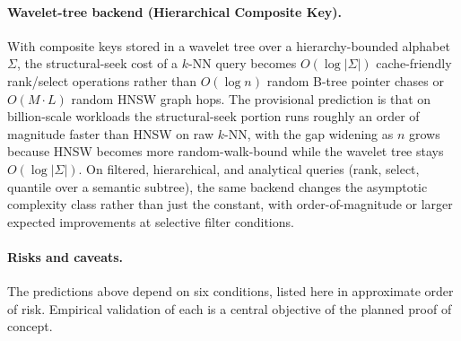 \documentclass[11pt]{article}
\begin{document}
\paragraph{Wavelet-tree backend (Hierarchical Composite Key).}
With composite keys stored in a wavelet tree over a hierarchy-bounded alphabet $\Sigma$, the structural-seek cost of a $k$-NN query becomes $O(\log|\Sigma|)$ cache-friendly rank/select operations rather than $O(\log n)$ random B-tree pointer chases or $O(M\cdot L)$ random HNSW graph hops. The provisional prediction is that on billion-scale workloads the structural-seek portion runs roughly an order of magnitude faster than HNSW on raw $k$-NN, with the gap widening as $n$ grows because HNSW becomes more random-walk-bound while the wavelet tree stays $O(\log|\Sigma|)$. On filtered, hierarchical, and analytical queries (rank, select, quantile over a semantic subtree), the same backend changes the asymptotic complexity class rather than just the constant, with order-of-magnitude or larger expected improvements at selective filter conditions.

\paragraph{Risks and caveats.}
The predictions above depend on six conditions, listed here in approximate order of risk. Empirical validation of each is a central objective of the planned proof of concept.
\end{document}
